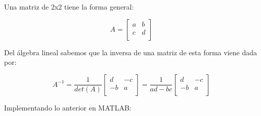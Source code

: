 
\sol

Una matriz de 2x2 tiene la forma general:

$$
A=\left[
\begin{array}{cc}
a & b \\
c & d \\
\end{array}
\right]
$$

Del álgebra lineal sabemos que la inversa de una matriz de esta forma viene dada por:

$$
A^{-1}=\frac{1}{det(A)}
\left[
\begin{array}{cc}
d & -c \\
-b & a \\
\end{array}
\right] = 
\frac{1}{ad-bc}
\left[ \begin{array}{cc}
d & -c \\
-b & a \\
\end{array} \right]
$$

Implementando lo anterior en MATLAB:

